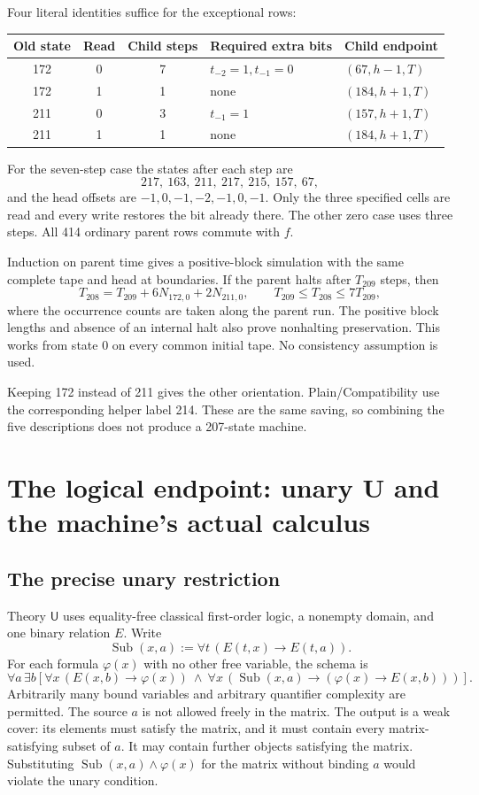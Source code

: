\documentclass[11pt,a4paper]{article}
\theoremstyle{definition}
\newcommand{\U}{\mathsf{U}}
\newcommand{\Sub}{\operatorname{Sub}}
\begin{document}
Four literal identities suffice for the exceptional rows:
\begin{center}
\begin{tabular}{@{}cccll@{}}
\toprule
Old state & Read & Child steps & Required extra bits & Child endpoint\\
\midrule
172 & 0 & 7 & $t_{-2}=1,t_{-1}=0$ & $(67,h-1,T)$\\
172 & 1 & 1 & none & $(184,h+1,T)$\\
211 & 0 & 3 & $t_{-1}=1$ & $(157,h+1,T)$\\
211 & 1 & 1 & none & $(184,h+1,T)$\\
\bottomrule
\end{tabular}
\end{center}
For the seven-step case the states after each step are
\[
217,\ 163,\ 211,\ 217,\ 215,\ 157,\ 67,
\]
and the head offsets are $-1,0,-1,-2,-1,0,-1$. Only the three specified cells are read and every write restores the bit already there. The other zero case uses three steps. All 414 ordinary parent rows commute with $f$.

Induction on parent time gives a positive-block simulation with the same complete tape and head at boundaries. If the parent halts after $T_{209}$ steps, then
\[
T_{208}=T_{209}+6N_{172,0}+2N_{211,0},\qquad
T_{209}\le T_{208}\le 7T_{209},
\]
where the occurrence counts are taken along the parent run. The positive block lengths and absence of an internal halt also prove nonhalting preservation. This works from state 0 on every common initial tape. No consistency assumption is used.

Keeping 172 instead of 211 gives the other orientation. Plain/Compatibility use the corresponding helper label 214. These are the same saving, so combining the five descriptions does not produce a 207-state machine.

\section{The logical endpoint: unary U and the machine's actual calculus}
\label{sec:theory}

\subsection{The precise unary restriction}

Theory $\U$ uses equality-free classical first-order logic, a nonempty domain, and one binary relation $E$. Write
\[
\Sub(x,a):=\forall t\,(E(t,x)\to E(t,a)).
\]
For each formula $\varphi(x)$ with no other free variable, the schema is
\begin{equation}
\forall a\,\exists b\left[
\forall x\,(E(x,b)\to\varphi(x))\ \land\
\forall x\,(\Sub(x,a)\to(\varphi(x)\to E(x,b)))
\right].\label{eq:U}
\end{equation}
Arbitrarily many bound variables and arbitrary quantifier complexity are permitted. The source $a$ is not allowed freely in the matrix. The output is a weak cover: its elements must satisfy the matrix, and it must contain every matrix-satisfying subset of $a$. It may contain further objects satisfying the matrix. Substituting $\Sub(x,a)\land\varphi(x)$ for the matrix without binding $a$ would violate the unary condition.
\end{document}
